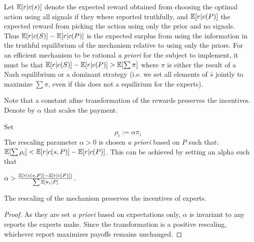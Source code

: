 Let $\operatorname*{\mathbb E}[r|c(s)]$ denote the expected reward obtained from choosing the optimal action using all signals if they where reported truthfully, and $\operatorname*{\mathbb E}[r|c(P)] $ the expected reward from picking the action using only the prior and no signals. Thus $\operatorname*{\mathbb E}[r|c(S)] - \operatorname*{\mathbb E}[r|c(P)] $ is the expected surplus from using the information in the truthful equilibrium of the mechanism relative to using only the priors. For an efficient mechanism to be rational \emph{a priori} for the subject to implement, it must be that $\operatorname*{\mathbb E}[r|c(S)] - \operatorname*{\mathbb E}[r|c(P)] > \operatorname*{\mathbb E}[\sum \pi]$ where $\pi$ is either the result of a Nash equilibrium or a dominant strategy (i.e. we set all elements of $\hat{s}$ jointly to maximize $\sum \pi$, even if this does not a equilirium for the experts).

Note that a constant afine transformation of the rewards preserves the incentives. Denote by $\alpha$ that scales the payment.

\begin{mech}
Set
\[
  \rho_i  := \alpha \pi_i
\]
The rescaling parameter $\alpha>0$ is chosen \emph{a priori} based on $P$ such that: $ \operatorname*{\mathbb E}[\sum \rho_i] < \operatorname*{\mathbb E}[r|c(s,P)] - \operatorname*{\mathbb E}[r|c(P)] $. This can be achieved by setting an alpha such that

 $\alpha >   \frac{\operatorname*{\mathbb E}[r|c(s,P)] - \operatorname*{\mathbb E}[r|c(P)] )}{\sum \operatorname*{\mathbb E}[\pi_i|P] }  $. 

\end{mech}



\begin{lem}
	The rescaling of the mechanism preserves the incentives of experts.
\end{lem}

\begin{proof}
	As they are set \emph{a priori} based on expectations only, $\alpha$ is invariant to any reports the experts make. Since the transformation is a positive rescaling, whichever report maximizes payoffs remains unchanged. 
\end{proof}


